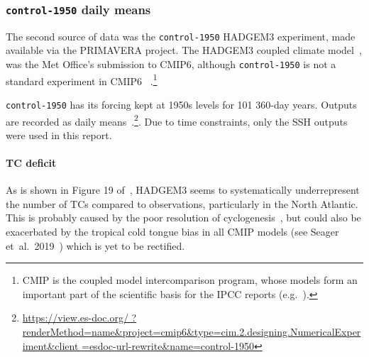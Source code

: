 \subsubsection{\texttt{control-1950} daily means}
\label{sec:control-1950-intro}

The second source of data was the \texttt{control-1950} HADGEM3 experiment,
made available via the PRIMAVERA project.
The HADGEM3 coupled climate model~\cite{williams2018met, FurtherInfo},
 was the Met Office's submission to CMIP6,
although \texttt{control-1950} is not a standard experiment in CMIP6~\cite{eyring2016overview}
.\footnote{CMIP is the coupled model intercomparison program,
whose models form an important part of the scientific basis for the IPCC
reports (e.g.~\cite{SROCC}).}

\texttt{control-1950} has its forcing kept at
1950s levels for 101 360-day years. Outputs are recorded as daily
means~\cite{williams2018met, FurtherInfo}.\footnote{\url{https://view.es-doc.org/
        ?renderMethod=name&project=cmip6&type=cim.2.designing.NumericalExperiment&client
        =esdoc-url-rewrite&name=control-1950}}.
Due to time constraints, only the SSH outputs were used in this report.

\paragraph{TC deficit} As is shown in Figure 19 of~\cite{williams2018met},
 HADGEM3 seems to systematically underrepresent
 the number of TCs compared to observations,
 particularly in the North Atlantic.
 This is probably caused by the poor resolution
 of cyclogenesis~\cite{tomassini2017interaction},
 but could also be exacerbated by the tropical
 cold tongue bias in all CMIP models (see Seager et~al.~2019~\cite{seager2019strengthening})
 which is yet to be rectified.
